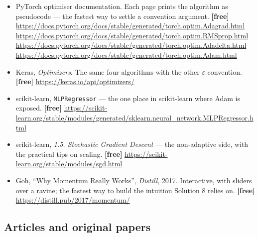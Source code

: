 \documentclass[11pt]{article}
\begin{document}
\begin{itemize}[leftmargin=*]
  \item PyTorch optimiser documentation. Each page prints the algorithm as
    pseudocode --- the fastest way to settle a convention argument.
    \textbf{[free]}
    \url{https://docs.pytorch.org/docs/stable/generated/torch.optim.Adagrad.html} \\
    \url{https://docs.pytorch.org/docs/stable/generated/torch.optim.RMSprop.html} \\
    \url{https://docs.pytorch.org/docs/stable/generated/torch.optim.Adadelta.html} \\
    \url{https://docs.pytorch.org/docs/stable/generated/torch.optim.Adam.html}
  \item Keras, \emph{Optimizers}. The same four algorithms with the other
    $\varepsilon$ convention. \textbf{[free]}
    \url{https://keras.io/api/optimizers/}
  \item scikit-learn, \texttt{MLPRegressor} --- the one place in scikit-learn
    where Adam is exposed. \textbf{[free]}
    \url{https://scikit-learn.org/stable/modules/generated/sklearn.neural_network.MLPRegressor.html}
  \item scikit-learn, \emph{1.5. Stochastic Gradient Descent} --- the
    non-adaptive side, with the practical tips on scaling. \textbf{[free]}
    \url{https://scikit-learn.org/stable/modules/sgd.html}
  \item Goh, ``Why Momentum Really Works'', \emph{Distill}, 2017. Interactive,
    with sliders over a ravine; the fastest way to build the intuition
    Solution 8 relies on. \textbf{[free]}
    \url{https://distill.pub/2017/momentum/}
\end{itemize}

\subsection*{Articles and original papers}
\end{document}
